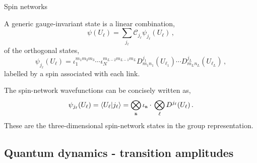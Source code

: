 \documentclass{beamer}
\begin{document}
\begin{frame}{Spin networks}
    \begin{list}{\maltese}{\leftmargin=1em \itemindent=0em}
        \item<1-> A generic gauge-invariant state is a linear combination,
        \begin{equation}
            \psi(U_\ell)=\sum_{j_\ell}\mathcal{C}_{j_\ell}\psi_{j_\ell}(U_\ell)\,,
        \end{equation}
        of the orthogonal states,
        \begin{equation}
            \psi_{j_\ell}(U_\ell)=\iota^{m_1m_2m_3}_1\cdots\iota^{m_{L-2}m_{L-1}m_L}_N D^{j_1}_{m_1n_1}(U_{\ell_1})\cdots D^{j_L}_{m_Ln_L}(U_{\ell_L})\,,
        \end{equation}
        labelled by a spin associated with each link.
        \item<2-> The spin-network wavefunctions can be concisely written as,
        \begin{equation}
            \psi_{j_\ell}(U_\ell)=\braket{U_\ell}{j_\ell}=\bigotimes_\mathtt{n}\iota_\mathtt{n}\cdot\,\bigotimes_\ell D^{j_\ell}(U_\ell)\,.
        \end{equation}
        These are the three-dimensional spin-network states in the group representation.
    \end{list}
\end{frame}

\subsection{Quantum dynamics - transition amplitudes}
\end{document}
